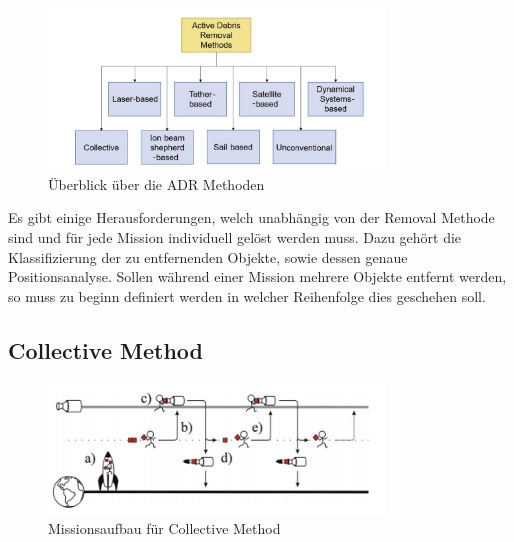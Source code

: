 				\begin{figure}[h]
				\centering
					\includegraphics[width=0.80\textwidth]{./graphics/ADR/ADR_methods.PNG}
				\caption{Überblick über die ADR Methoden}
				\label{fig:ARD Methoden}
			\end{figure}
Es gibt einige Herausforderungen, welch unabhängig von der Removal Methode sind und für jede Mission individuell gelöst werden muss. Dazu gehört die Klassifizierung der zu entfernenden Objekte, sowie dessen genaue Positionsanalyse. Sollen während einer Mission mehrere Objekte entfernt werden, so muss zu beginn definiert werden in welcher Reihenfolge dies geschehen soll. 

	\subsection{Collective Method}
	
				\begin{figure}[h]
			\centering
					\includegraphics[width=0.80\textwidth]{./graphics/ADR/collective_method.PNG}
				\caption{Missionsaufbau für Collective Method}
				\label{fig:Sammelmethoden}
			\end{figure}
	
